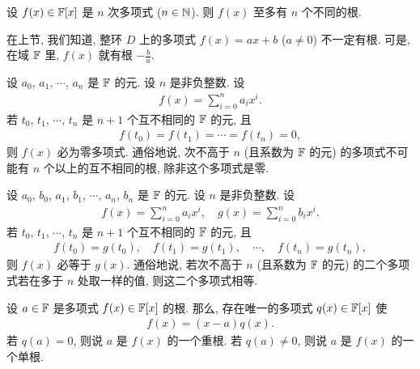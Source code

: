 \begin{proposition}
    设 $f(x) \in \mathbb{F}[x]$ 是 $n$ 次多项式 ($n \in \mathbb{N}$). 则 $f(x)$ 至多有 $n$ 个不同的根.
\end{proposition}

\begin{remark}
    在上节, 我们知道, 整环 $D$ 上的多项式 $f(x) = ax + b$ ($a \neq 0$) 不一定有根. 可是, 在域 $\mathbb{F}$ 里, $f(x)$ 就有根 $-\frac{b}{a}$.
\end{remark}

\begin{proposition}
    设 $a_0$, $a_1$, $\cdots$, $a_n$ 是 $\mathbb{F}$ 的元. 设 $n$ 是非负整数. 设
    \begin{align*}
        f(x) = \sum_{i = 0}^n a_i x^i.
    \end{align*}
    若 $t_0$, $t_1$, $\cdots$, $t_n$ 是 $n+1$ 个互不相同的 $\mathbb{F}$ 的元, 且
    \begin{align*}
        f(t_0) = f(t_1) = \cdots = f(t_n) = 0,
    \end{align*}
    则 $f(x)$ 必为零多项式. 通俗地说, 次不高于 $n$ (且系数为 $\mathbb{F}$ 的元) 的多项式不可能有 $n$ 个以上的互不相同的根, 除非这个多项式是零.
\end{proposition}

\begin{proposition}
    设 $a_0$, $b_0$, $a_1$, $b_1$, $\cdots$, $a_n$, $b_n$ 是 $\mathbb{F}$ 的元. 设 $n$ 是非负整数. 设
    \begin{align*}
        f(x) = \sum_{i = 0}^n a_i x^i, \quad g(x) = \sum_{i = 0}^n b_i x^i.
    \end{align*}
    若 $t_0$, $t_1$, $\cdots$, $t_n$ 是 $n+1$ 个互不相同的 $\mathbb{F}$ 的元, 且
    \begin{align*}
        f(t_0) = g(t_0), \quad f(t_1) = g(t_1), \quad \cdots, \quad f(t_n) = g(t_n),
    \end{align*}
    则 $f(x)$ 必等于 $g(x)$. 通俗地说, 若次不高于 $n$ (且系数为 $\mathbb{F}$ 的元) 的二个多项式若在多于 $n$ 处取一样的值, 则这二个多项式相等.
\end{proposition}

\begin{definition}
    设 $a \in \mathbb{F}$ 是多项式 $f(x) \in \mathbb{F}[x]$ 的根. 那么, 存在唯一的多项式 $q(x) \in \mathbb{F}[x]$ 使
    \begin{align*}
        f(x) = (x - a) q(x).
    \end{align*}
    若 $q(a) = 0$, 则说 $a$ 是 $f(x)$ 的一个重根. 若 $q(a) \neq 0$, 则说 $a$ 是 $f(x)$ 的一个单根.
\end{definition}

